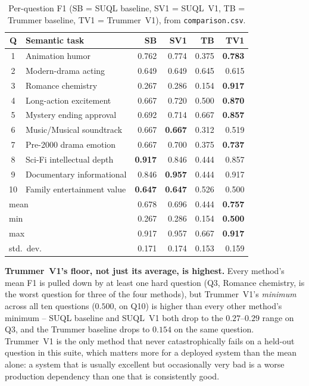 \begin{table}[h]
\centering\small
\begin{tabular}{clrrrr}
\toprule
Q & Semantic task & SB & SV1 & TB & \textbf{TV1} \\
\midrule
1  & Animation humor              & 0.762 & 0.774 & 0.375 & \textbf{0.783} \\
2  & Modern-drama acting          & 0.649 & 0.649 & 0.645 & 0.615 \\
3  & Romance chemistry            & 0.267 & 0.286 & 0.154 & \textbf{0.917} \\
4  & Long-action excitement       & 0.667 & 0.720 & 0.500 & \textbf{0.870} \\
5  & Mystery ending approval      & 0.692 & 0.714 & 0.667 & \textbf{0.857} \\
6  & Music/Musical soundtrack     & 0.667 & \textbf{0.667} & 0.312 & 0.519 \\
7  & Pre-2000 drama emotion       & 0.667 & 0.700 & 0.375 & \textbf{0.737} \\
8  & Sci-Fi intellectual depth    & \textbf{0.917} & 0.846 & 0.444 & 0.857 \\
9  & Documentary informational    & 0.846 & \textbf{0.957} & 0.444 & 0.917 \\
10 & Family entertainment value   & \textbf{0.647} & \textbf{0.647} & 0.526 & 0.500 \\
\midrule
\multicolumn{2}{l}{mean} & 0.678 & 0.696 & 0.444 & \textbf{0.757} \\
\multicolumn{2}{l}{min}  & 0.267 & 0.286 & 0.154 & \textbf{0.500} \\
\multicolumn{2}{l}{max}  & 0.917 & 0.957 & 0.667 & \textbf{0.917} \\
\multicolumn{2}{l}{std.\ dev.} & 0.171 & 0.174 & 0.153 & 0.159 \\
\bottomrule
\end{tabular}
\caption{Per-question F1 (SB = SUQL baseline, SV1 = SUQL~V1, TB =
Trummer baseline, TV1 = Trummer~V1), from \texttt{comparison.csv}.}
\label{tab:per-question-f1}
\end{table}

\textbf{Trummer~V1's floor, not just its average, is highest.} Every
method's mean F1 is pulled down by at least one hard question (Q3,
Romance chemistry, is the worst question for three of the four methods),
but Trummer~V1's \emph{minimum} across all ten questions ($0.500$, on
Q10) is higher than every other method's minimum -- SUQL baseline and
SUQL~V1 both drop to the $0.27$--$0.29$ range on Q3, and the Trummer
baseline drops to $0.154$ on the same question. Trummer~V1 is the only
method that never catastrophically fails on a held-out question in this
suite, which matters more for a deployed system than the mean alone: a
system that is usually excellent but occasionally very bad is a worse
production dependency than one that is consistently good.

